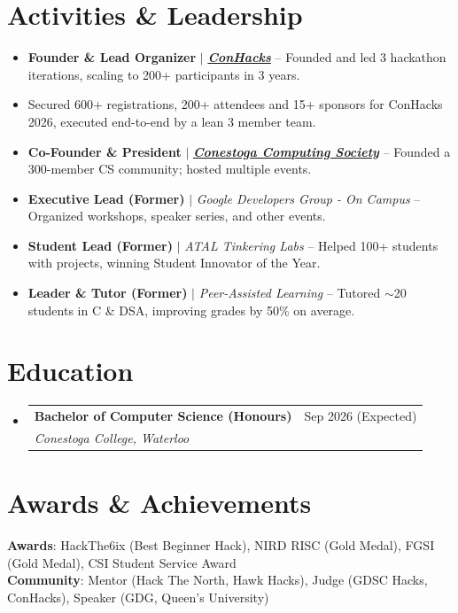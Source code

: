 \documentclass[letterpaper,10pt]{article}
\makeatletter
\newcommand{\resumeSubheading}[4]{
  \vspace{-2pt}\item
    \begin{tabular*}{0.97\textwidth}[t]{l@{\extracolsep{\fill}}r}
      \textbf{#1} & #2 \\
      \textit{\small#3} & \textit{\small #4} \\
    \end{tabular*}\vspace{-7pt}
}
\newcommand{\resumeSubHeadingListStart}{\begin{itemize}[leftmargin=0.15in, label={}]}
\newcommand{\resumeSubHeadingListEnd}{\end{itemize}}
\makeatother
\begin{document}
\section{Activities \& Leadership}
    \resumeSubHeadingListStart
        \item\small{
            \textbf{Founder \& Lead Organizer} $|$ \emph{\href{https://conhacks.io}{\textbf{ConHacks}}} -- Founded and led 3 hackathon iterations, scaling to 200+ participants in 3 years. \vspace{-2pt}
        }
        \item\small{
            Secured 600+ registrations, 200+ attendees and 15+ sponsors for ConHacks 2026, executed end-to-end by a lean 3 member team. \vspace{-2pt}
        }
        \item\small{
            \textbf{Co-Founder \& President} $|$ \emph{\href{https://conestogacomputingsociety.com}{\textbf{Conestoga Computing Society}}} -- Founded a 300-member CS community; hosted multiple events. \vspace{-2pt}
        }
        \item\small{
            \textbf{Executive Lead (Former)} $|$ \emph{Google Developers Group - On Campus} -- Organized workshops, speaker series, and other events. \vspace{-2pt}
        }
        \item\small{
            \textbf{Student Lead (Former)} $|$ \emph{ATAL Tinkering Labs} -- Helped 100+ students with projects, winning Student Innovator of the Year. \vspace{-2pt}
        }
        \item\small{
            \textbf{Leader \& Tutor (Former)} $|$ \emph{Peer-Assisted Learning} -- Tutored $\sim$20 students in C \& DSA, improving grades by 50\% on average. \vspace{-2pt}
        }
    \resumeSubHeadingListEnd


\section{Education}
  \resumeSubHeadingListStart
    \resumeSubheading
      {Bachelor of Computer Science (Honours)}{Sep 2026 (Expected)}
      {Conestoga College, Waterloo}{}
  \resumeSubHeadingListEnd


\section{Awards \& Achievements}
 \begin{itemize}[leftmargin=0.15in, label={}]
    \small{\item{
     \textbf{Awards}{: HackThe6ix (Best Beginner Hack), NIRD RISC (Gold Medal), FGSI (Gold Medal), CSI Student Service Award} \\
     \textbf{Community}{: Mentor (Hack The North, Hawk Hacks), Judge (GDSC Hacks, ConHacks), Speaker (GDG, Queen's University)}
    }}
 \end{itemize}


\end{document}
